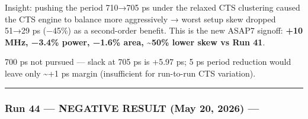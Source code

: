 \begin{record}
Insight: pushing the period 710→705 ps under the relaxed CTS clustering
caused the CTS engine to balance more aggressively → worst setup skew
dropped 51→29 ps (−45\%) as a second-order benefit. This is the new
ASAP7 signoff: \textbf{+10 MHz, −3.4\% power, −1.6\% area,
\textasciitilde50\% lower skew vs Run 41}.

700 ps not pursued --- slack at 705 ps is +5.97 ps; 5 ps period
reduction would leave only \textasciitilde+1 ps margin (insufficient for
run-to-run CTS variation).

\begin{center}\rule{0.5\linewidth}{0.5pt}\end{center}

\end{record}

\subsubsection{\texorpdfstring{Run 44 --- NEGATIVE RESULT (May 20, 2026)
---
}{Run 44 --- NEGATIVE RESULT (May 20, 2026) --- }}\label{cr:run:asap7:run-44-negative-result-may-20-2026-run-2026-05-20-21-43-24}

